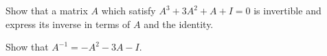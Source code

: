 
\begin{Exercise}[
name={},
title={}, 
difficulty=0,
origin={\cite{YL}}]
Show that a matrix $A$ which satisfy $A^3+3A^2+A+I=0$ is invertible and express its inverse in terms of $A$ and the identity.
\end{Exercise}

\begin{Answer}
Show that $A^{-1}=-A^2-3A -I$.
\end{Answer}
